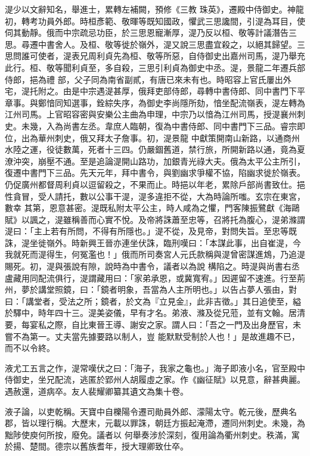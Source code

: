\begin{pinyinscope}
 湜少以文辭知名，舉進士，累轉左補闕，預修《三教
 珠英》，遷殿中侍御史。神龍初，轉考功員外郎。時桓彥範、敬暉等既知國政，懼武三思讒間，引湜為耳目，使伺其動靜。俄而中宗疏忌功臣，於三思恩寵漸厚，湜乃反以桓、敬等計議潛告三思。尋遷中書舍人。及桓、敬等徙於嶺外，湜又說三思盡宜殺之，以絕其歸望。三思問誰可使者，湜表兄周利貞先為桓、敬等所惡，自侍御史出嘉州司馬，湜乃舉充此行。桓、敬等聞利貞至，多自殺，三思引利貞為御史中丞。湜，景龍二年遷兵部侍郎，挹為禮
 部，父子同為南省副貳，有唐已來未有也。時昭容上官氏屢出外宅，湜托附之。由是中宗遇湜甚厚，俄拜吏部侍郎，尋轉中書侍郎、同中書門下平章事。與鄭愔同知選事，銓綜失序，為御史李尚隱所劾，愔坐配流嶺表，湜左轉為江州司馬。上官昭容密與安樂公主曲為申理，中宗乃以愔為江州司馬，授湜襄州刺史。未幾，入為尚書左丞。韋庶人臨朝，復為中書侍郎、同中書門下三品。睿宗即位，出為華州刺史，俄又拜太子詹事。初，湜景龍
 中獻策開南山新路，以通商州水陸之運，役徒數萬，死者十三四。仍嚴錮舊道，禁行旅，所開新路以通，竟為夏潦沖突，崩壓不通。至是追論湜開山路功，加銀青光祿大夫。俄為太平公主所引，復遷中書門下三品。先天元年，拜中書令，與劉幽求爭權不協，陷幽求徙於嶺表。仍促廣州都督周利貞以逗留殺之，不果而止。時挹以年老，累除戶部尚書致仕。挹性貪冒，受人請托，數以公事干湜，湜多違拒不從，大為時論所嗤。玄宗在東宮，數幸
 其第，恩意甚密。湜既私附太平公主，時人咸為之懼，門客陳振鷺獻《海鷗賦》以諷之，湜雖稱善而心實不悅。及帝將誅蕭至忠等，召將托為腹心，湜弟滌謂湜曰：「主上若有所問，不得有所隱也。」湜不從，及見帝，對問失旨。至忠等既誅，湜坐徙嶺外。時新興王晉亦連坐伏誅，臨刑嘆曰：「本謀此事，出自崔湜，今我就死而湜得生，何冤濫也！」俄而所司奏宮人元氏款稱與湜曾密謀進鴆，乃追湜賜死。初，湜與張說有隙，說時為中書令，議者以為說
 構陷之。時湜與尚書右丞盧藏用同配流俱行，湜謂藏用曰：「家弟承恩，或冀寬宥。」因遲留不速進。行至荊州，夢於講堂照鏡，曰：「鏡者明象，吾當為人主所明也。」以告占夢人張由，對曰：「講堂者，受法之所；鏡者，於文為『立見金』，此非吉徵。」其日追使至，縊於驛中，時年四十三。湜美姿儀，早有才名。弟液、滌及從兄蒞，並有文翰。居清要，每宴私之際，自比東晉王導、謝安之家。謂人曰：「吾之一門及出身歷官，未嘗不為第一。丈夫當先據要路以制人，豈
 能默默受制於人也！」是故進趣不已，而不以令終。



 液尤工五言之作，湜常嘆伏之曰：「海子，我家之龜也。」海子即液小名，官至殿中侍御史，坐兄配流，逃匿於郢州人胡履虛之家。作《幽征賦》以見意，辭甚典麗。遇赦還，道病卒。友人裴耀卿纂其遺文為集十卷。



 液子論，以吏乾稱。天寶中自櫟陽令遷司勛員外郎、濛陽太守。乾元後，歷典名郡，皆以理行稱。大歷末，元載以罪誅，朝廷方振起淹滯，遷同州刺史。未幾，為黜陟使庾何所按，廢免。議者以
 何舉奏涉於深刻，復用論為衢州刺史。秩滿，寓於揚、楚間。德宗以舊族耆年，授大理卿致仕卒。




\end{pinyinscope}
